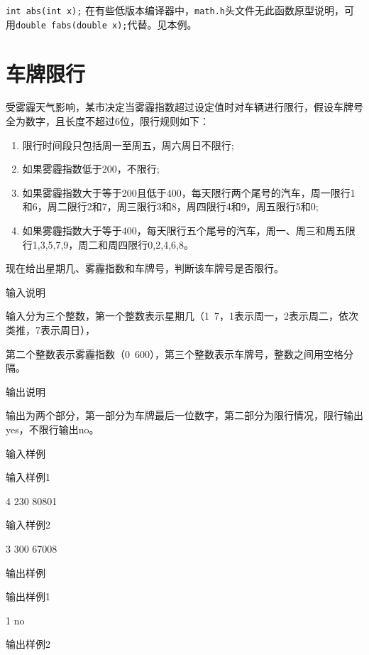 \begin{note}[整数求绝对值函数]
	\lstinline|int abs(int x);| 在有些低版本编译器中，\lstinline|math.h|头文件无此函数原型说明，可用\lstinline|double fabs(double x);|代替。见本例。
\end{note}

\section{车牌限行}
受雾霾天气影响，某市决定当雾霾指数超过设定值时对车辆进行限行，假设车牌号全为数字，且长度不超过6位，限行规则如下： 
\begin{enumerate}
	\item 限行时间段只包括周一至周五，周六周日不限行;
	\item 如果雾霾指数低于200，不限行;
	\item 如果雾霾指数大于等于200且低于400，每天限行两个尾号的汽车，周一限行1和6，周二限行2和7，周三限行3和8，周四限行4和9，周五限行5和0;
	\item 如果雾霾指数大于等于400，每天限行五个尾号的汽车，周一、周三和周五限行1,3,5,7,9，周二和周四限行0,2,4,6,8。 	
\end{enumerate}
现在给出星期几、雾霾指数和车牌号，判断该车牌号是否限行。 

输入说明

输入分为三个整数，第一个整数表示星期几（1~7，1表示周一，2表示周二，依次类推，7表示周日），

第二个整数表示雾霾指数（0~600），第三个整数表示车牌号，整数之间用空格分隔。

输出说明

输出为两个部分，第一部分为车牌最后一位数字，第二部分为限行情况，限行输出yes，不限行输出no。

输入样例

输入样例1 

4 230 80801 

输入样例2 

3 300 67008

输出样例

输出样例1 

1 no 

输出样例2 

